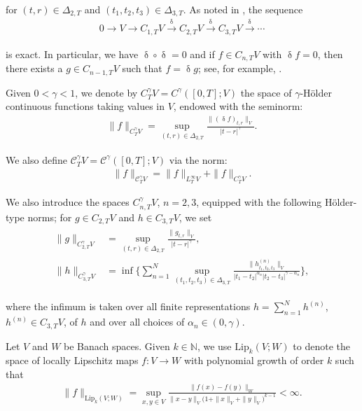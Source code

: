 \documentclass[letterpaper, 11pt,  reqno]{amsart}
\newcommand{\1}{\hspace{0.5mm}\text{I}\hspace{0.5mm}}
\newcommand{\noi}{\noindent}
\newcommand{\CC}{\mathcal{C}}
\newcommand{\al}{\alpha}
\newcommand{\updl}{\updelta}
\newcommand{\Dl}{\Delta}
\newcommand{\g}{\gamma}
\newcommand{\N}{\mathbb{N}}
\newcommand{\Lip}{\mathrm{Lip}}
\newcommand{\too}{\longrightarrow}
\numberwithin{equation}{section}
\numberwithin{theorem}{section}
\begin{document}
\noi
for $(t,r)\in\Dl_{2,T}$
and $(t_1,t_2,t_3) \in \Dl_{3,T}$.
As noted in \cite{GT10}, 
the sequence 
\begin{align*}
0 \too V \too C_{1, T}V \stackrel{\updl}{\too} C_{2, T}V
\stackrel{\updl}{\too} C_{3, T}V
\stackrel{\updl}{\too} \cdots
\end{align*}

\noi
is exact. 
In particular, we have 
 $\updl\circ\updl =0$ and 
if $f \in C_{n,T} V$ with $\updl f =0$, 
then there exists a $g\in C_{n-1,T}V$ 
such that $f= \updl g$; 
see, for example,  \cite[Lemma 2.1]{GT10}. 


Given $0 < \g < 1$, we denote by $C^\g_T V = C^\g([0, T]; V)$ the space of $\g$-H\"older continuous functions taking values in $V$, endowed  with the seminorm:
\begin{align*}
\|f\|_{C^\g_T V} = \sup_{(t,r)\in \Dl_{2,T}} 
\frac{\|(\updl f)_{t,r}\|_V}{|t-r|^\g}.
\end{align*}

\noi
We also define 
 $\CC^\g_T V = \CC^\g([0, T]; V)$ via the norm:
\begin{align}
\| f \|_{\CC^\g_TV} = \| f \|_{L^\infty_TV} + \|f\|_{C^\g_T V}.
\label{Ho2a}
\end{align}


\noi 
We also introduce the spaces 
$C^\g_{n,T}V$, $n=2,3$, 
equipped with the following H\"older-type norms;
 for $g\in C_{2,T}V$ and $h\in C_{3,T}V$, we set
\begin{align}
\begin{split}
\| g\|_{C^\g_{2,T} V} & 
= \sup_{(t,r) \in \Dl_{2,T}} \frac{\|g_{t,r} \|_{V} }{|t-r|^{\g}}, \\
\| h\|_{C^\g_{3,T} V} & 
= \inf\Bigg\{
\sum_{n = 1}^N \sup_{(t_1,t_2,t_3) \in \Dl_{3,T}} 
\frac{ \|h^{(n)}_{t_1,t_2,t_3}\|_V}
{|t_1-t_2|^{\al_n} |t_2-t_3|^{\g-\al_n}}\Bigg\}, 
\end{split}
\label{Ho2}
\end{align}


\noi
where the infimum is taken over all finite representations
$h = \sum_{n= 1}^N h^{(n)}$,   $h^{(n)} \in C_{3,T}V$, of $h$
and over all choices of $\al_n \in (0, \g)$.

\medskip


Let $V$ and $W$ be Banach spaces.
Given $k \in \N$, 
we  use $\Lip_k(V; W)$ 
to denote the  space of 
locally Lipschitz maps $f:V\to W$
with polynomial growth of order $k$
such that 
\begin{align}
\|f\|_{\Lip_k(V; W)} = 
\sup_{x,y\in V} 
\frac{\|f(x)-f(y)\|_W}{\|x-y\|_V \big(1+\|x\|_V+\|y\|_V\big)^{k-1}}
<\infty .
\label{Lip1}
\end{align}
\end{document}
